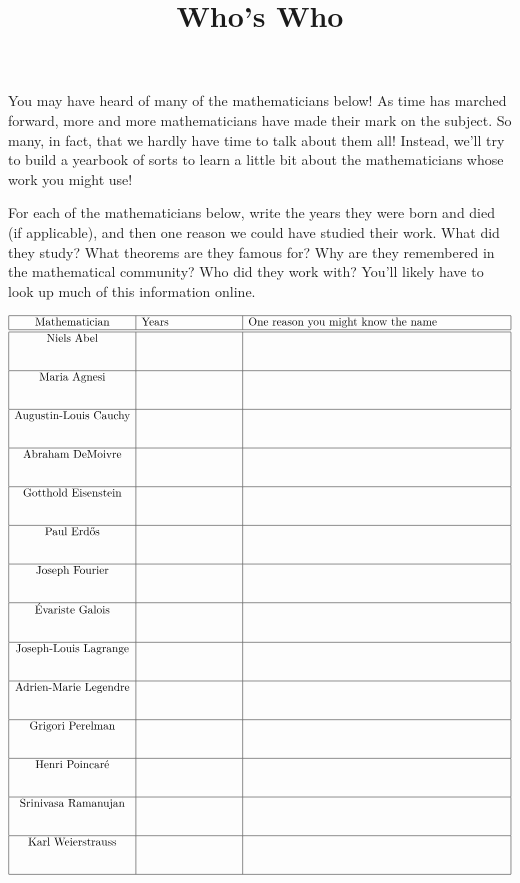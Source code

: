 \documentclass[handout,nooutcomes]{ximera}
\title{Who's Who}
\begin{document}
\begin{abstract}
    
\end{abstract}
\maketitle

You may have heard of many of the mathematicians below!  As time has marched forward, more and more mathematicians have made their mark on the subject.  So many, in fact, that we hardly have time to talk about them all!  Instead, we'll try to build a yearbook of sorts to learn a little bit about the mathematicians whose work you might use!

For each of the mathematicians below, write the years they were born and died (if applicable), and then one reason we could have studied their work.  What did they study?  What theorems are they famous for?  Why are they remembered in the mathematical community?  Who did they work with?  You'll likely have to look up much of this information online.


\[\begin{array}{|c|c|c|}
\hline
\text{Mathematician} & \text{Years \hspace{2cm}} & \text{One reason you might know the name \hspace{2cm}}  \\
\hline \hline

\text{Niels Abel} & &   \\ [0.3in]\hline
\text{Maria Agnesi} &  &  \\ [0.3in]\hline
\text{Augustin-Louis Cauchy} &  &  \\ [0.3in]\hline
\text{Abraham DeMoivre} & &   \\ [0.3in] \hline
\text{Gotthold Eisenstein} &  &  \\ [0.3in]\hline
\text{Paul Erd\H{o}s} &  &  \\ [0.3in]\hline
\text{Joseph Fourier}  & &  \\ [0.3in]\hline
\text{\'{E}variste Galois}  & &  \\ [0.3in]\hline
\text{Joseph-Louis Lagrange}  & &  \\ [0.3in]\hline
\text{Adrien-Marie Legendre}  & &  \\ [0.3in]\hline
\text{Grigori Perelman}  & &  \\ [0.3in]\hline
\text{Henri Poincar\'{e}} &  &  \\ [0.3in]\hline
\text{Srinivasa Ramanujan} &  &  \\ [0.3in]\hline
\text{Karl Weierstrauss} &  & \\ [0.3in]\hline



\end{array}\]
\end{document}
